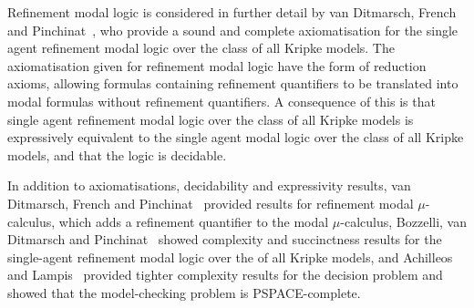 Refinement modal logic is considered in further detail by van Ditmarsch, French and Pinchinat~\cite{vanditmarsch:2010}, who provide a sound and complete axiomatisation for the single agent refinement modal logic over the class of all Kripke models.
The axiomatisation given for refinement modal logic have the form of reduction axioms, allowing formulas containing refinement quantifiers to be translated into modal formulas without refinement quantifiers.
A consequence of this is that single agent refinement modal logic over the class of all Kripke models is expressively equivalent to the single agent modal logic over the class of all Kripke models, and that the logic is decidable.

In addition to axiomatisations, decidability and expressivity results, van Ditmarsch, French and Pinchinat~\cite{vanditmarsch:2010} provided results for refinement modal $\mu$-calculus, which adds a refinement quantifier to the modal $\mu$-calculus, Bozzelli, van Ditmarsch and Pinchinat~\cite{bozzelli:2014a} showed complexity and succinctness results for the single-agent refinement modal logic over the \classK{} of all Kripke models, and Achilleos and Lampis~\cite{achilleos:2013} provided tighter complexity results for the decision problem and showed that the model-checking problem is PSPACE-complete.
